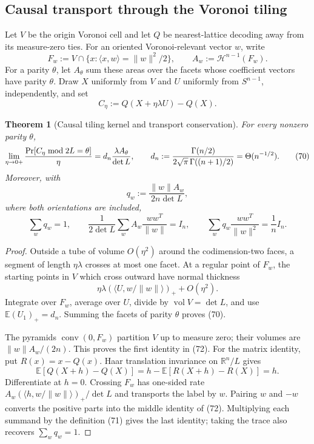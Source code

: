 \documentclass[10pt]{article}
\newtheorem{theorem}{Theorem}[section]
\theoremstyle{definition}
\newcommand{\R}{\mathbb{R}}
\newcommand{\E}{\mathbb{E}}
\newcommand{\Prb}{\mathop{\rm Pr}}
\newcommand{\ip}[2]{\langle #1,#2\rangle}
\newcommand{\norm}[1]{\lVert #1\rVert}
\begin{document}
\subsection{Causal transport through the Voronoi tiling}

Let $V$ be the origin Voronoi cell and let $Q$ be nearest-lattice decoding
away from its measure-zero ties.  For an oriented Voronoi-relevant vector
$w$, write
\[
 F_w:=V\cap\{x:\ip{x}{w}=\norm w^2/2\},\qquad
 A_w:=\mathcal H^{n-1}(F_w).                                  \tag{68}
\]
For a parity $\theta$, let $A_\theta$ sum these areas over the facets whose
coefficient vectors have parity $\theta$.  Draw $X$ uniformly from $V$ and
$U$ uniformly from $S^{n-1}$, independently, and set
\[
 C_\eta:=Q(X+\eta\lambda U)-Q(X).                              \tag{69}
\]

\begin{theorem}[Causal tiling kernel and transport conservation]
                                                                    \label{thm:causal}
For every nonzero parity $\theta$,
\[
 \lim_{\eta\to0+}
 \frac{\Prb[C_\eta\bmod2L=\theta]}{\eta}
 =d_n\frac{\lambda A_\theta}{\det L},\qquad
 d_n:=\frac{\Gamma(n/2)}{2\sqrt\pi\,\Gamma((n+1)/2)}
     =\Theta(n^{-1/2}).                                       \tag{70}
\]
Moreover, with
\[
 q_w:=\frac{\norm w A_w}{2n\det L},                            \tag{71}
\]
where both orientations are included,
\[
 \sum_wq_w=1,\qquad
 \frac1{2\det L}\sum_w A_w\frac{ww^T}{\norm w}=I_n,\qquad
 \sum_wq_w\frac{ww^T}{\norm w^2}=\frac1nI_n.                 \tag{72}
\]
\end{theorem}

\begin{proof}
Outside a tube of volume $O(\eta^2)$ around the codimension-two faces, a
segment of length $\eta\lambda$ crosses at most one facet.  At a regular
point of $F_w$, the starting points in $V$ which cross outward have normal
thickness
\[
 \eta\lambda\left(\ip{U}{w/\norm w}\right)_++O(\eta^2).
\]
Integrate over $F_w$, average over $U$, divide by $\operatorname{vol}V=\det
L$, and use $\E(U_1)_+=d_n$.  Summing the facets of parity $\theta$ proves
(70).

The pyramids $\operatorname{conv}(0,F_w)$ partition $V$ up to measure zero;
their volumes are $\norm wA_w/(2n)$.  This proves the first identity in
(72).  For the matrix identity, put $R(x)=x-Q(x)$.  Haar translation
invariance on $\R^n/L$ gives
\[
 \E[Q(X+h)-Q(X)]=h-\E[R(X+h)-R(X)]=h.                          \tag{73}
\]
Differentiate at $h=0$.  Crossing $F_w$ has one-sided rate
$A_w(\ip{h}{w/\norm w})_+/\det L$ and transports the label by $w$.
Pairing $w$ and $-w$ converts the positive parts into the middle identity of
(72).  Multiplying each summand by the definition (71) gives the last
identity; taking the trace also recovers $\sum_wq_w=1$.
\end{proof}
\end{document}
